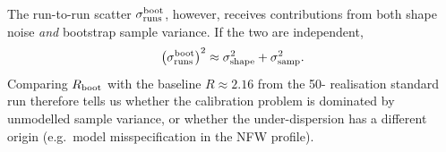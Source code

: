 \documentclass[11pt,a4paper]{article}
\begin{document}
The run-to-run scatter $\sigma_{\rm runs}^{\rm boot}$, however, receives
contributions from both shape noise \emph{and} bootstrap sample variance.
If the two are independent,
\begin{equation}
  \left(\sigma_{\rm runs}^{\rm boot}\right)^2
  \approx
  \sigma_{\rm shape}^2 + \sigma_{\rm samp}^2.
\end{equation}
Comparing $R_{\rm boot}$ with the baseline $R \approx 2.16$ from the 50-
realisation standard run therefore tells us whether the calibration problem
is dominated by unmodelled sample variance, or whether the under-dispersion
has a different origin (e.g.\ model misspecification in the NFW profile).
\end{document}
